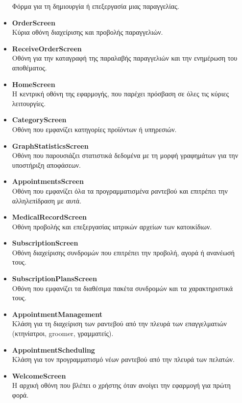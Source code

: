 \documentclass[12pt,a4paper,twoside]{book}
\begin{document}
\begin{itemize}
          Φόρμα για τη δημιουργία ή επεξεργασία μιας παραγγελίας. %
    \item \textbf{OrderScreen}\\
          Κύρια οθόνη διαχείρισης και προβολής παραγγελιών. %
    \item \textbf{ReceiveOrderScreen}\\
          Οθόνη για την καταγραφή της παραλαβής παραγγελιών και την ενημέρωση του αποθέματος.
    \item \textbf{HomeScreen}\\
          Η κεντρική οθόνη της εφαρμογής, που παρέχει πρόσβαση σε όλες τις κύριες λειτουργίες.
    \item \textbf{CategoryScreen}\\
          Οθόνη που εμφανίζει κατηγορίες προϊόντων ή υπηρεσιών.
    \item \textbf{GraphStatisticsScreen}\\
          Οθόνη που παρουσιάζει στατιστικά δεδομένα με τη μορφή γραφημάτων για την υποστήριξη αποφάσεων. %
    \item \textbf{AppointmentsScreen}\\
          Οθόνη που εμφανίζει όλα τα προγραμματισμένα ραντεβού και επιτρέπει την αλληλεπίδραση με αυτά. %
    \item \textbf{MedicalRecordScreen}\\
          Οθόνη προβολής και επεξεργασίας ιατρικών αρχείων των κατοικίδιων. %
    \item \textbf{SubscriptionScreen}\\
          Οθόνη διαχείρισης συνδρομών που επιτρέπει την προβολή, αγορά ή ανανέωσή τους. %
    \item \textbf{SubscriptionPlansScreen}\\
          Οθόνη που εμφανίζει τα διαθέσιμα πακέτα συνδρομών και τα χαρακτηριστικά τους. %
    \item \textbf{AppointmentManagement}\\
          Κλάση για τη διαχείριση των ραντεβού από την πλευρά των επαγγελματιών (κτηνίατροι, groomer, γραμματείς). %
    \item \textbf{AppointmentScheduling}\\
          Κλάση για τον προγραμματισμό νέων ραντεβού από την πλευρά των πελατών.
    \item \textbf{WelcomeScreen}\\
          Η αρχική οθόνη που βλέπει ο χρήστης όταν ανοίγει την εφαρμογή για πρώτη φορά.

\end{itemize}
\end{document}
